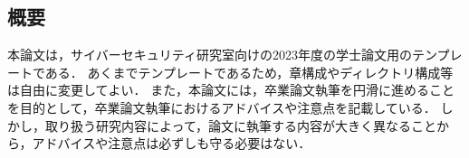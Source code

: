 \begin{center}
\subsection*{概要}
\end{center}

本論文は，サイバーセキュリティ研究室向けの2023年度の学士論文用のテンプレートである．
あくまでテンプレートであるため，章構成やディレクトリ構成等は自由に変更してよい．
また，本論文には，卒業論文執筆を円滑に進めることを目的として，卒業論文執筆におけるアドバイスや注意点を記載している．
しかし，取り扱う研究内容によって，論文に執筆する内容が大きく異なることから，アドバイスや注意点は必ずしも守る必要はない．

